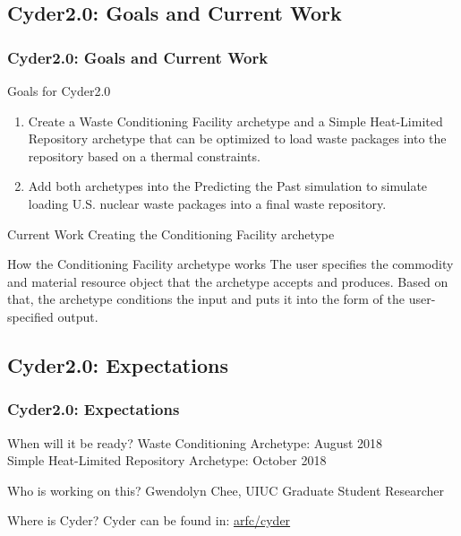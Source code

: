 \subsection{Cyder2.0: Goals and Current Work}
\begin{frame}
  \frametitle{Cyder2.0: Goals and Current Work}

\begin{block}{Goals for Cyder2.0}
\begin{enumerate}
	\item Create a Waste Conditioning Facility archetype and a Simple Heat-Limited Repository archetype that can be optimized to load waste packages into the repository based on a thermal constraints. 
	\item Add both archetypes into the Predicting the Past \Cyclus simulation to simulate loading U.S. nuclear waste packages into a final waste repository. 
\end{enumerate}
\end{block}

\begin{block}{Current Work}
	Creating the Conditioning Facility archetype
\end{block}

\begin{block}{How the Conditioning Facility archetype works}
The user specifies the commodity and material resource object that the archetype accepts and produces. Based on that, the archetype conditions the input and puts it into the form of the user-specified output.
\end{block}

\end{frame}

\subsection{Cyder2.0: Expectations}

\begin{frame}
\frametitle{Cyder2.0: Expectations}

\begin{block}{When will it be ready?}
	Waste Conditioning Archetype: August 2018 \\
	Simple Heat-Limited Repository Archetype: October 2018 
\end{block}

\begin{block}{Who is working on this?}
	Gwendolyn Chee, UIUC Graduate Student Researcher
\end{block}

\begin{block}{Where is Cyder?}
	Cyder can be found in: \href{https://github.com/arfc/cyder}{arfc/cyder} 
\end{block}

\end{frame}

